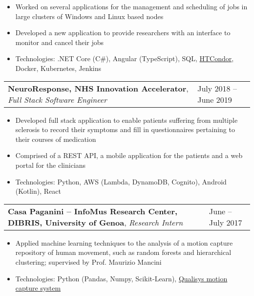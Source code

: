 \documentclass[a4paper, 10pt]{article}
\makeatletter
\newenvironment{workdetails}{\addvspace{3pt} \begin{tabu} to \textwidth {@{}X[4l] X[1r]@{}}}{\end{tabu}}
\newcommand{\company}[1]{\normalsize \textbf{#1}}
\newcommand{\timerange}[1]{\normalsize #1}
\newcommand{\position}[1]{\normalsize \textit{#1}}
\newenvironment{info}{\small \begin{itemize}[
    noitemsep,
    topsep=-3pt,
    leftmargin=*,
    align=parleft
]}{\end{itemize}}
\newcommand{\Csh}{C\#}
\makeatother
\begin{document}
        \begin{info}
            \item Worked on several applications for the management and scheduling of jobs in large clusters of Windows and Linux based nodes
            \item Developed a new application to provide researchers with an interface to monitor and cancel their jobs
            \item Technologies: .NET Core (\Csh{}), Angular (TypeScript), SQL, \href{https://research.cs.wisc.edu/htcondor/}{HTCondor}, Docker, Kubernetes, Jenkins
        \end{info}
    
        \begin{workdetails}
            \company{NeuroResponse, NHS Innovation Accelerator}, \position{Full Stack Software Engineer} & \timerange{July 2018 -- June 2019}
        \end{workdetails}

        \begin{info}
            \item Developed full stack application to enable patients suffering from multiple sclerosis to record their symptoms and fill in questionnaires pertaining to their courses of medication
            \item Comprised of a REST API, a mobile application for the patients and a web portal for the clinicians
            \item Technologies: Python, AWS (Lambda, DynamoDB, Cognito), Android (Kotlin), React
        \end{info}

        \begin{workdetails}
            \company{Casa Paganini -- InfoMus Research Center, DIBRIS, University of Genoa}, \position{Research Intern} & \timerange{June -- July 2017}
        \end{workdetails}

        \begin{info}
            \item Applied machine learning techniques to the analysis of a motion capture repository of human movement, such as random forests and hierarchical clustering; supervised by Prof. Maurizio Mancini
            \item Technologies: Python (Pandas, Numpy, Scikit-Learn), \href{http://www.qualisys.com/software/qualisys-track-manager/}{Qualisys motion capture system}
        \end{info}
\end{document}
